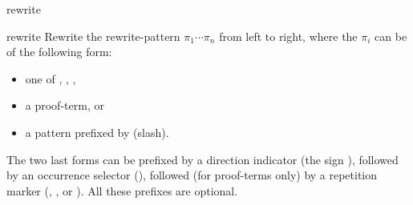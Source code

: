 \begin{tactic}{rewrite}
  \begin{tsyntax}[empty]{rewrite}
  Rewrite the rewrite-pattern $\pi_1 \cdots \pi_n$ from left to right,
  where the $\pi_i$ can be of the following form:
  \begin{itemize}
  \item one of \tct{//}, \tct{/=}, \tct{//=},
  \item a proof-term, or
  \item a pattern prefixed by \tct{/} (slash).
  \end{itemize}
  The two last forms can be prefixed by a direction indicator (the sign
  \tct{-}), followed by an occurrence selector (),
  followed (for proof-terms only) by a repetition marker
  (\tct{!}, ,  or ). All these prefixes are optional.


\end{tsyntax}
\end{tactic}
